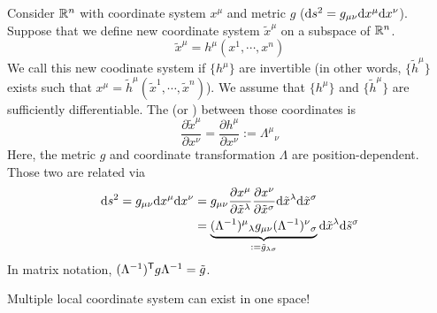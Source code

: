 \documentclass[a4paper, 10pt]{article}
\begin{document}
\begin{obs}
    Consider $\mathbb{R}^{n}$ with coordinate system $x^{\mu}$ and metric $g$ ($\mathrm{d}{s}^{2} = g_{\mu\nu}\mathrm{d}{x}^{\mu}\mathrm{d}{x}^{\nu}$). Suppose that we define new  coordinate system $\tilde{x}^{\mu}$ on a subspace of $\mathbb{R}^{n}$.
    \[ \tilde{x}^{\mu} = h^{\mu}(x^{1},\cdots,x^{n}) \]
    We call this new coodinate system  if $\{h^{\mu}\}$ are invertible (in other words, $\{\tilde{h}^{\mu}\}$ exists such that $x^{\mu} = \tilde{h}^{\mu}(\tilde{x}^{1},\cdots,\tilde{x}^{n})$). We assume that $\{h^{\mu}\}$ and $\{\tilde{h}^{\mu}\}$ are sufficiently differentiable. The  (or ) between those coordinates is
    \[ \frac{\partial\tilde{x}^{\mu}}{\partial{x}^{\nu}} = \frac{\partial{h}^{\mu}}{\partial{x}^{\nu}} := \Lambda^{\mu}{}_{\nu} \]
    Here, the metric $g$ and coordinate transformation $\Lambda$ are position-dependent. Those two are related via
    \begin{align*}
        \mathrm{d}{s}^{2} = g_{\mu\nu}\mathrm{d}{x}^{\mu}\mathrm{d}{x}^{\nu} &= g_{\mu\nu}\frac{\partial{x}^{\mu}}{\partial\tilde{x}^{\lambda}}\frac{\partial{x}^{\nu}}{\partial\tilde{x}^{\sigma}}\mathrm{d}\tilde{x}^{\lambda}\mathrm{d}\tilde{x}^{\sigma} \\
        &= \underbrace{(\Lambda^{-1})^{\mu}{}_{\lambda}g_{\mu\nu}(\Lambda^{-1})^{\nu}{}_{\sigma}}_{:= \tilde{g}_{\lambda\sigma}} \mathrm{d}\tilde{x}^{\lambda}\mathrm{d}\tilde{s}^{\sigma}
    \end{align*}
    In matrix notation, $(\Lambda^{-1})^{\mathsf{T}}g\Lambda^{-1} = \tilde{g}$.
\end{obs}
\begin{remark}
    Multiple local coordinate system can exist in one space!
\end{remark}

\seprule
\end{document}
